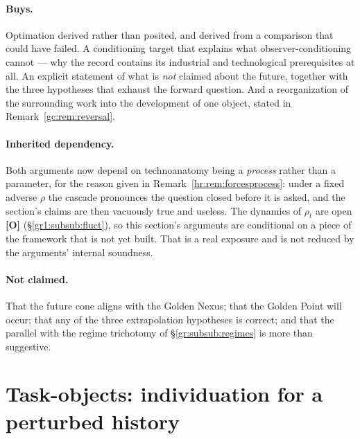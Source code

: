 \documentclass[11pt]{article}
\numberwithin{equation}{section}
\theoremstyle{plain}
\theoremstyle{definition}
\theoremstyle{remark}
\begin{document}
\paragraph{Buys.} Optimation derived rather than posited, and derived
from a comparison that could have failed. A conditioning target that
explains what observer-conditioning cannot --- why the record contains
its industrial and technological prerequisites at all. An explicit
statement of what is \emph{not} claimed about the future, together with
the three hypotheses that exhaust the forward question. And a
reorganization of the surrounding work into the development of one
object, stated in Remark~\ref{gc:rem:reversal}.

\paragraph{Inherited dependency.} Both arguments now depend on
technoanatomy being a \emph{process} rather than a parameter, for the
reason given in Remark~\ref{hr:rem:forcesprocess}: under a fixed
adverse $\rho$ the cascade pronounces the question closed before it is
asked, and the section's claims are then vacuously true and useless.
The dynamics of $\rho_t$ are open \textbf{[O]}
(\S\ref{gr1:subsub:fluct}), so this section's arguments are conditional
on a piece of the framework that is not yet built. That is a real
exposure and is not reduced by the arguments' internal soundness.

\paragraph{Not claimed.} That the future cone aligns with the Golden
Nexus; that the Golden Point will occur; that any of the three
extrapolation hypotheses is correct; and that the parallel with the
regime trichotomy of \S\ref{gr:subsub:regimes} is more than suggestive.

\section{Task-objects: individuation for a perturbed history}
\label{to:sec}
\end{document}
